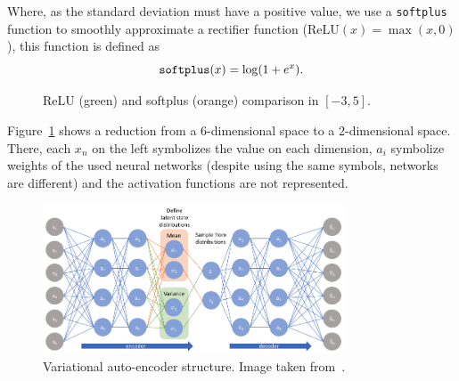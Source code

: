 Where, as the standard deviation must have a positive value, we use a \texttt{softplus} function to smoothly approximate a rectifier function (\(\text{ReLU}(x) = \max(x,0)\)), this function is defined as
\[
  \text{\texttt{softplus}}(x) = \log(1 + e^{x}).
\]

\begin{figure}[H]
  \centering
  \caption{ReLU (green) and softplus (orange) comparison in \([-3, 5]\).}
\end{figure}

Figure~\ref{fig:vae} shows a reduction from a \(6\)-dimensional space to a \(2\)-dimensional space. There, each \(x_{n}\) on the left symbolizes the value on each dimension, \(a_{i}\) symbolize weights of the used neural networks (despite using the same symbols, networks are different) and the activation functions are not represented.

\begin{figure}[h]
  \centering
  \includegraphics[width=0.8\textwidth]{tex/images/vae.png}
  \caption{Variational auto-encoder structure. Image taken from~\cite{JeremyJordan}.}\label{fig:vae}
\end{figure}
